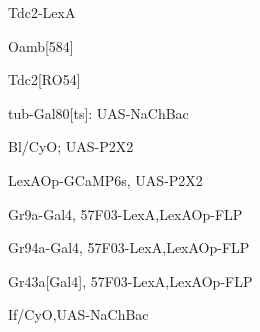 \documentclass[17pt]{extarticle}
\begin{document}
\footnotesize
\newpage\vspace*{-0.15cm}
\begin{large}
Tdc2-LexA \\[0.5em]
\end{large}
\footnotesize
\newpage\vspace*{-0.15cm}
\begin{large}
Oamb[584] \\[0.5em]
\end{large}
\footnotesize
\newpage\vspace*{-0.15cm}
\begin{large}
Tdc2[RO54] \\[0.5em]
\end{large}
\footnotesize
\newpage\vspace*{-0.15cm}
\begin{footnotesize}
tub-Gal80[ts]: UAS-NaChBac \\[0.5em]
\end{footnotesize}
\footnotesize
\newpage\vspace*{-0.15cm}
\begin{footnotesize}
Bl/CyO; UAS-P2X2 \\[0.5em]
\end{footnotesize}
\footnotesize
\newpage\vspace*{-0.15cm}
\begin{footnotesize}
LexAOp-GCaMP6s, UAS-P2X2 \\[0.5em]
\end{footnotesize}
\footnotesize
\newpage\vspace*{-0.15cm}
\begin{scriptsize}
Gr9a-Gal4, 57F03-LexA,LexAOp-FLP \\[0.5em]
\end{scriptsize}
\footnotesize
\newpage\vspace*{-0.15cm}
\begin{scriptsize}
Gr94a-Gal4, 57F03-LexA,LexAOp-FLP \\[0.5em]
\end{scriptsize}
\footnotesize
\newpage\vspace*{-0.15cm}
\begin{scriptsize}
Gr43a[Gal4], 57F03-LexA,LexAOp-FLP \\[0.5em]
\end{scriptsize}
\footnotesize
\newpage\vspace*{-0.15cm}
\begin{footnotesize}
If/CyO,UAS-NaChBac \\[0.5em]
\end{footnotesize}
\end{document}
